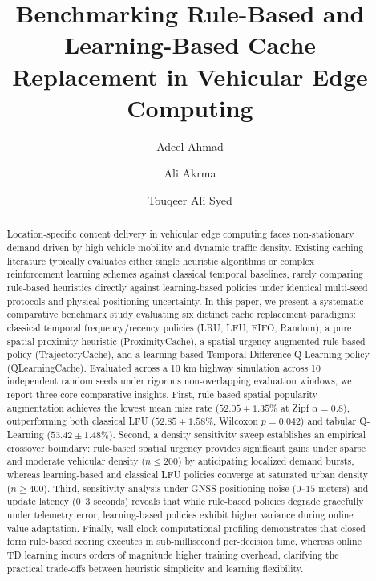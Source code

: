 \documentclass[preprint,12pt]{elsarticle}
\begin{document}
	
	\begin{frontmatter}
		
		\title{Benchmarking Rule-Based and Learning-Based Cache Replacement in Vehicular Edge Computing}
		
		\author[1]{Adeel Ahmad}
		
		\author[1,2]{Ali Akrma}
		
		\author[1]{Touqeer Ali Syed}
		
		
		\address[1]{AI Center, Faculty of Computer and Information Systems, Islamic University of Madinah, Madinah 42351, Saudi Arabia}
		
		\address[2]{AI V\&V Lab, King Fahd University of Petroleum and Minerals, Dhahran, Saudi Arabia}
		
	
		\begin{abstract}
		Location-specific content delivery in vehicular edge computing faces non-stationary demand driven by high vehicle mobility and dynamic traffic density. Existing caching literature typically evaluates either single heuristic algorithms or complex reinforcement learning schemes against classical temporal baselines, rarely comparing rule-based heuristics directly against learning-based policies under identical multi-seed protocols and physical positioning uncertainty. In this paper, we present a systematic comparative benchmark study evaluating six distinct cache replacement paradigms: classical temporal frequency/recency policies (LRU, LFU, FIFO, Random), a pure spatial proximity heuristic (ProximityCache), a spatial-urgency-augmented rule-based policy (TrajectoryCache), and a learning-based Temporal-Difference Q-Learning policy (QLearningCache). Evaluated across a 10 km highway simulation across 10 independent random seeds under rigorous non-overlapping evaluation windows, we report three core comparative insights. First, rule-based spatial-popularity augmentation achieves the lowest mean miss rate ($52.05 \pm 1.35$\% at Zipf $\alpha=0.8$), outperforming both classical LFU ($52.85 \pm 1.58$\%, Wilcoxon $p=0.042$) and tabular Q-Learning ($53.42 \pm 1.48$\%). Second, a density sensitivity sweep establishes an empirical crossover boundary: rule-based spatial urgency provides significant gains under sparse and moderate vehicular density ($n \leq 200$) by anticipating localized demand bursts, whereas learning-based and classical LFU policies converge at saturated urban density ($n \geq 400$). Third, sensitivity analysis under GNSS positioning noise ($0$--$15$ meters) and update latency ($0$--$3$ seconds) reveals that while rule-based policies degrade gracefully under telemetry error, learning-based policies exhibit higher variance during online value adaptation. Finally, wall-clock computational profiling demonstrates that closed-form rule-based scoring executes in sub-millisecond per-decision time, whereas online TD learning incurs orders of magnitude higher training overhead, clarifying the practical trade-offs between heuristic simplicity and learning flexibility.
		\end{abstract}
		

\end{frontmatter}
\end{document}

